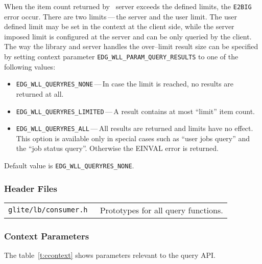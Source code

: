 %
When the item count returned by \LB\ server exceeds the defined
limits, the \verb'E2BIG' error occur. There are two limits\,---\,the server
and the user limit. The user defined limit may be set in the context
at the client side, while the server imposed limit is configured at
the server and can be only queried by the client. The way the \LB
library and server handles the over--limit result size can be
specified by setting context parameter
\verb'EDG_WLL_PARAM_QUERY_RESULTS' to one of the following values:
\begin{itemize}
\item \verb'EDG_WLL_QUERYRES_NONE'\,---\,In case the limit is reached,
no results are returned at all.
\item \verb'EDG_WLL_QUERYRES_LIMITED'\,---\,A result contains at most
``limit'' item count.
\item \verb'EDG_WLL_QUERYRES_ALL'\,---\,All results are returned and
limits have no effect. This option is available only in special cases
such as ``user jobs query'' and  the ``job status query''. Otherwise
the EINVAL error is returned.
\end{itemize}
Default value is \verb'EDG_WLL_QUERYRES_NONE'.


\subsubsection{Header Files}
\begin{table}[h!]
\begin{tabularx}{\textwidth}{>{\tt}lX}
glite/lb/consumer.h & Prototypes for all query functions. \\
\end{tabularx}
\end{table}

\subsubsection{Context Parameters}
The table~\ref{t:ccontext} shows parameters relevant to the query API.

